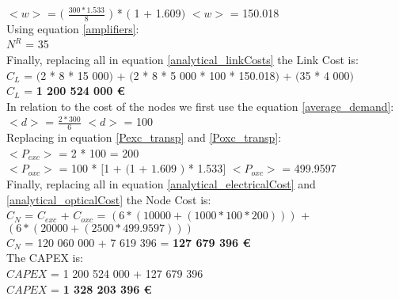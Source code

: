 $<w>$ = $($ $\frac{300 * 1.533}{8}$ $)$ * $($ 1 + 1.609$)$ \qquad \qquad $<w>$ = 150.018\\

Using equation \ref{amplifiers}:\\

$N^R$ = 35\\

Finally, replacing all in equation \ref{analytical_linkCosts} the Link Cost is:\\

$C_L$ = $($2 * 8 * 15 000$)$ + $($2 * 8 * 5 000 * 100 * 150.018$)$ + $($35 * 4 000$)$\\

$C_L$ = \textbf{1 200 524 000 \euro}\\

In relation to the cost of the nodes we first use the equation \ref{average_demand}:\\

$<d>$ = $\frac{2 * 300}{6}$ \qquad \qquad $<d>$ = 100\\

Replacing in equation \ref{Pexc_transp} and \ref{Poxc_transp}:\\

$<P_{exc}>$ = 2 * 100 = 200\\

$<P_{oxc}>$ = 100 * $[$1 + $($1 + $1.609$ $)$ * 1.533$]$ \qquad \quad $<P_{oxc}>$ = 499.9597 \\

Finally, replacing all in equation \ref{analytical_electricalCost} and \ref{analytical_opticalCost} the Node Cost is:\\

$C_N$ = $C_{exc}$ + $C_{oxc}$ = $\left( 6*(10 000 + (1 000 * 100 * 200 ) ) \right)$ + $\left(6*(20 000 + (2 500 * 499.9597 ) ) \right)$\\

$C_N$ = 120 060 000 + 7 619 396 = \textbf{127 679 396 \euro}\\

The CAPEX is:\\
$CAPEX$ = 1 200 524 000 + 127 679 396\\

$CAPEX$ = \textbf{1 328 203 396 \euro}\\

